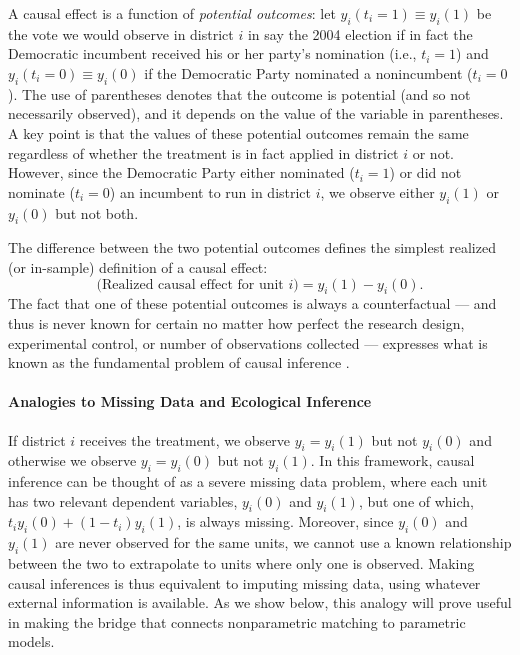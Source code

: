 \documentclass[11pt,titlepage]{article}
\begin{document}
A causal effect is a function of \emph{potential outcomes}: let
$y_i(t_i=1)\equiv y_i(1)$ be the vote we would observe in district $i$
in say the 2004 election if in fact the Democratic incumbent received
his or her party's nomination (i.e., $t_i=1$) and $y_i(t_i=0)\equiv
y_i(0)$ if the Democratic Party nominated a nonincumbent ($t_i=0$).
The use of parentheses denotes that the outcome is potential (and so
not necessarily observed), and it depends on the value of the variable
in parentheses.  A key point is that the values of these potential
outcomes remain the same regardless of whether the treatment is in
fact applied in district $i$ or not.  However, since the Democratic
Party either nominated ($t_i=1$) or did not nominate ($t_i=0$) an
incumbent to run in district $i$, we observe either $y_{i}(1)$ or
$y_{i}(0)$ but not both.

The difference between the two potential outcomes defines the simplest
realized (or in-sample) definition of a causal effect:
\begin{equation}
  \label{rce}
  \text{(Realized causal effect for unit $i$)} = y_i(1) - y_i(0).
\end{equation}
The fact that one of these potential outcomes is always a
counterfactual --- and thus is never known for certain no matter how
perfect the research design, experimental control, or number of
observations collected --- expresses what is known as the fundamental
problem of causal inference \citep{Holland86}.

\paragraph{Analogies to Missing Data and Ecological Inference}
If district $i$ receives the treatment, we observe $y_i=y_i(1)$ but
not $y_i(0)$ and otherwise we observe $y_i=y_i(0)$ but not $y_i(1)$.
In this framework, causal inference can be thought of as a severe
missing data problem, where each unit has two relevant dependent
variables, $y_i(0)$ and $y_i(1)$, but one of which, $t_iy_i(0) +
(1-t_i)y_i(1)$, is always missing.  Moreover, since $y_i(0)$ and
$y_i(1)$ are never observed for the same units, we cannot use a known
relationship between the two to extrapolate to units where only one is
observed.  Making causal inferences is thus equivalent to imputing
missing data, using whatever external information is available.  As we
show below, this analogy will prove useful in making the bridge that
connects nonparametric matching to parametric models.
\end{document}
